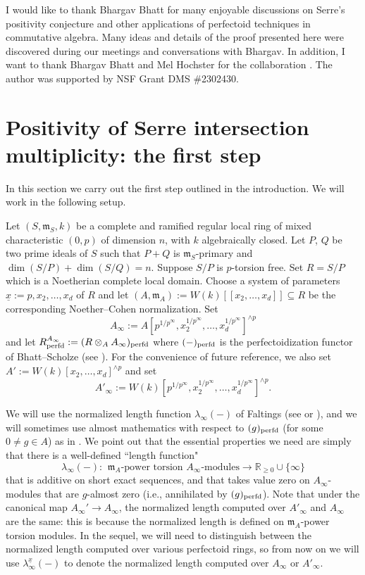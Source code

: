 \documentclass[12pt]{amsart}
\numberwithin{equation}{theorem}
\numberwithin{equation}{theorem}
\renewcommand{\m}{\mathfrak{m}}
\newcommand{\perfd}{\textnormal{perfd}}
\begin{document}
I would like to thank Bhargav Bhatt for many enjoyable discussions on Serre's positivity conjecture and other applications of perfectoid techniques in commutative algebra. Many ideas and details of the proof presented here were discovered during our meetings and conversations with Bhargav. In addition, I want to thank Bhargav Bhatt and Mel Hochster for the collaboration \cite{BhattHochsterMaLimCM2026}. The author was supported by NSF Grant DMS \#2302430.


\newpage
\section{Positivity of Serre intersection multiplicity: the first step}
\label{sec: first step}

In this section we carry out the first step outlined in the introduction. We will work in the following setup. 

\begin{setting}
\label{setting: step 1}
Let $(S,\m_S,k)$ be a complete and ramified regular local ring of mixed characteristic $(0,p)$ of dimension $n$, with $k$ algebraically closed.  Let $P$, $Q$ be two prime ideals of $S$ such that $P+Q$ is $\m_S$-primary and $\dim(S/P)+\dim(S/Q)=n$. Suppose $S/P$ is $p$-torsion free. Set $R=S/P$ which is a Noetherian complete local domain.  Choose a system of parameters $\underline{x} :=p, x_2,\dots, x_d$ of $R$ and let $(A,\m_A):=W(k)[[x_2,\dots,x_d]]\subseteq R$ be the corresponding Noether--Cohen normalization. Set 
$$A_\infty:= A[p^{1/p^\infty}, x_2^{1/p^\infty},\dots,x_d^{1/p^\infty}]^{\wedge p}$$
and let $R^{A_\infty}_{\perfd}:= (R\otimes_AA_\infty)_{\perfd}$ where $(-)_{\perfd}$ is the perfectoidization functor of Bhatt--Scholze (see \cite[Section 8]{BhattScholzePrismaticCohomology2022}). For the convenience of future reference, we also set $A':=W(k)[x_2,\dots,x_d]^{\wedge p}$ and set
$$A'_\infty := W(k)[p^{1/p^\infty}, x_2^{1/p^\infty},\dots,x_d^{1/p^\infty}]^{\wedge p}.$$
\end{setting}

We will use the normalized length function $\lambda_\infty(-)$ of Faltings (see \cite{FaltingsAlmostEtale2002} or \cite[Section 2.2]{CaiLeeMaSchwedeTuckerPerfdSignature2026}), and we will sometimes use almost mathematics with respect to $(g)_\perfd$ (for some $0\neq g\in A$) as in \cite[Section 10]{BhattScholzePrismaticCohomology2022}. We point out that the essential properties we need are simply that there is a well-defined ``length function"
$$\lambda_\infty(-): \,\ \text{$\m_A$-power torsion $A_\infty$-modules} \longrightarrow \mathbb{R}_{\geq 0} \cup \{\infty\}$$
that is additive on short exact sequences, and that takes value zero on $A_\infty$-modules that are $g$-almost zero (i.e., annihilated by $(g)_\perfd$). Note that under the canonical map $A_\infty'\to A_\infty$, the normalized length computed over $A'_\infty$ and $A_\infty$ are the same: this is because the normalized length is defined on $\m_A$-power torsion modules. In the sequel, we will need to distinguish between the normalized length computed over various perfectoid rings, so from now on we will use $\lambda_\infty^{\underline{x}}(-)$ to denote the normalized length computed over $A_\infty$ or $A'_\infty$. 
\end{document}
